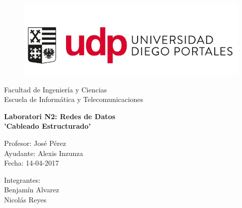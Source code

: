 \documentclass[onecolumn,11pts]{IEEEtran}
\date{November 2016}
\begin{document}
\begin{titlepage}

\begin{center}
\vspace*{-1in}
\begin{figure}[htb]
\begin{center}
\includegraphics[scale=0.4]{UDP}
\end{center}
\end{figure}
Facultad de Ingeniería y Ciencias\\Escuela de Informática y Telecomunicaciones\\
\vspace*{0.15in}
\vspace*{1in}

\begin{LARGE}
\textbf{Laboratori N2: Redes de Datos \\ 'Cableado Estructurado'} \\
\end{LARGE}
\vspace*{1in}
\begin{large}
Profesor: José Pérez \\Ayudante: Alexis Inzunza \\ Fecha: 14-04-2017
\end{large}
\vspace*{0.3in}
\vspace*{1in}
\begin{large}
\begin{flushright}

Integrantes: \\
Benjamín Alvarez \\ Nicolás Reyes \\ 
\end{flushright}
\end{large}
\end{center}
\end{titlepage}


\tableofcontents %

\cleardoublepage
\end{document}
